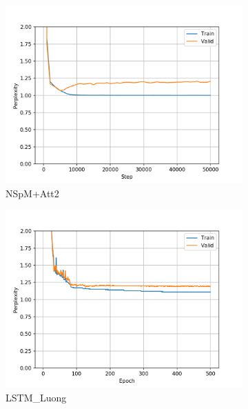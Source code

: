 \begin{figure}[h]
\begin{subfigure}{0.3\textwidth}
\includegraphics[width=\textwidth]{../results/monument_600/run1/neural_sparql_machine_luong_attention/ppls.png} 
\caption{NSpM+Att2}
\label{fig:monu600 nsmluo ppl}
\end{subfigure}
\hfill
\begin{subfigure}{0.3\textwidth}
\includegraphics[width=\textwidth]{../results/monument_600/run1/lstm_luong_wmt_en_de/ppls.png}
\caption{LSTM\_Luong}
\label{fig:monu600 lstm ppl}
\end{subfigure}
\hfill
\begin{subfigure}{0.3\textwidth}

\end{subfigure}
\end{figure}
